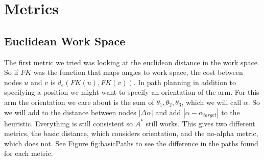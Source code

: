 \documentclass{article}
\begin{document}
\section{Metrics }
\subsection{Euclidean Work Space}
The first metric we tried was looking at the euclidean distance in the work space. So if $FK$ was the function that maps angles to work space, the cost between nodes $u$ and $v$ is $d_{e}(FK(u),FK(v))$. In path planning in addition to specifying a position we might want to specify an orientation of the arm. For this arm the orientation we care about is the sum of $\theta_1,\theta_2,\theta_3$, which we will call $\alpha$.
So we will add to the distance between nodes $|\Delta\alpha|$ and add $|\alpha- \alpha_{target}|$ to the heuristic. Everything is still consistent so $A^*$ still works. This gives two different metrics, the basic distance, which considers orientation, and the no-alpha metric, which does not. See Figure {fig:basicPaths} to see the difference in the paths found for each metric.\\
\end{document}
